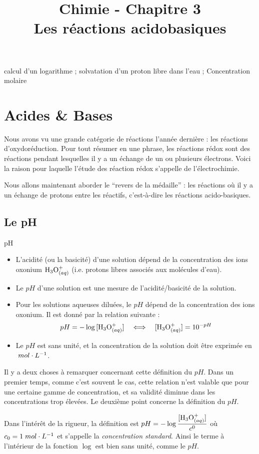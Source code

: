 \documentclass[11pt,a4paper]{article}
\title{\large Chimie - Chapitre 3 \\ \LARGE  Les réactions acidobasiques}
\begin{document}
\maketitle
\vspace{-1cm}
\begin{tcolorbox}[title=Notions de la classe de première à rappeler]
calcul d'un logarithme ; solvatation d'un proton libre dans l'eau ; Concentration molaire
\end{tcolorbox}
\tableofcontents

\section{Acides \& Bases}
Nous avons vu une grande catégorie de réactions l'année dernière : les réactions d'oxydoréduction. Pour tout résumer en une phrase, les réactions rédox sont des réactions pendant lesquelles il y a un échange de un ou plusieurs électrons. Voici la raison pour laquelle l'étude des réaction rédox s'appelle de l'électrochimie. 

Nous allons maintenant aborder le ``revers de la médaille'' : les réactions où il y a un échange de protons entre les réactifs, c'est-à-dire les réactions acido-basiques. 

\subsection{Le pH}

\begin{defn}{pH }
\begin{itemize}
    \item L'acidité (ou la basicité) d'une solution dépend de la concentration des ions oxonium  $\oxo$ (i.e. protons libres associés aux molécules d’eau).
    \item Le $pH$ d'une solution est une mesure de l'acidité/basicité de la solution.
    \item Pour les solutions aqueuses diluées, le $pH$ dépend de la concentration des ions oxonium. Il est donné par la relation suivante : 
    \[  pH = -\log{[\oxo]} \quad \Longleftrightarrow \quad [\oxo] = 10^{-pH}\] 
    \item Le $pH$ est sans unité, et la concentration de la solution doit être exprimée en $\; mol\cdot L^{-1}$. 
\end{itemize}
\end{defn}

\begin{rmrq} Il y a deux choses à remarquer concernant cette définition du $pH$. Dans un premier temps, comme c'est souvent le cas, cette relation n'est valable que pour une certaine gamme de concentration, et sa validité diminue dans les concentrations trop élevées. Le deuxième point concerne la définition du $pH$. 

Dans l'intérêt de la rigueur, la définition est $pH = -\log{\dfrac{[\oxo]}{c^0}}$ où $c_0 = 1\; mol\cdot L^{-1}$ et s'appelle la \emph{concentration standard}. Ainsi le terme à l'intérieur de la fonction $\log$ est bien sans unité, comme le $pH$. 
\end{rmrq}
\end{document}
